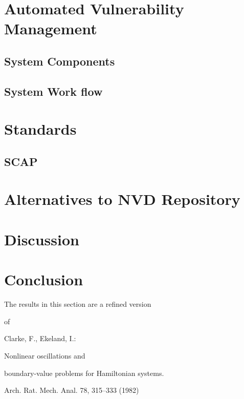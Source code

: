 \documentclass{llncs}
\begin{document}
\section{Automated Vulnerability Management}

\subsection{System Components}
\subsection{System Work flow}

\newpage
\section{Standards}
\subsection{SCAP}

\newpage

\section{Alternatives to NVD Repository}


\newpage
\section{Discussion}

\newpage
\section{Conclusion}
The results in this section are a refined version

of \cite{clar}

\begin{thebibliography}{[MT1]}

%


Clarke, F., Ekeland, I.:

Nonlinear oscillations and

boundary-value problems for Hamiltonian systems.

Arch. Rat. Mech. Anal. 78, 315--333 (1982)

%
\end{thebibliography}
\end{document}
